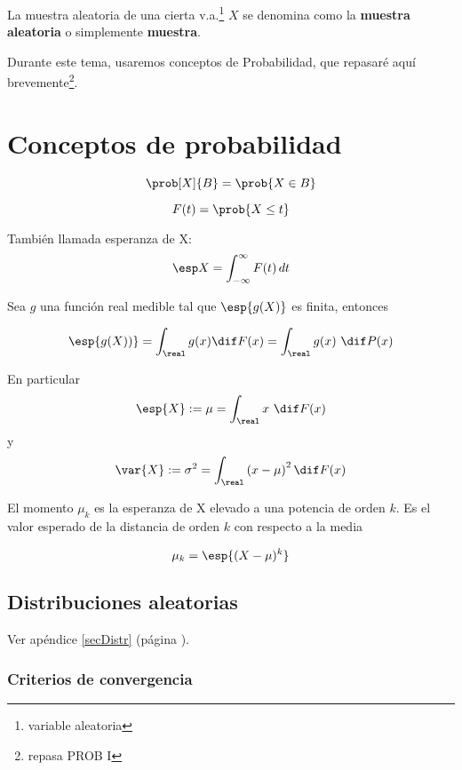 \documentclass{apuntes}
\begin{document}
La muestra aleatoria de una cierta v.a.\footnote{variable aleatoria} $X$ se denomina como la \textbf{muestra aleatoria} o simplemente \textbf{muestra}.

Durante este tema, usaremos conceptos de Probabilidad, que repasaré aquí brevemente\footnote{repasa PROB I}.

\section{Conceptos de probabilidad}

\begin{defn}
\[ \prob[X]{B} = \prob{X \in B} \]
\end{defn}

\begin{defn}
\[F(t) = \prob{X \leq t} \]
\end{defn}

\begin{defn}  También llamada esperanza de X:
\[ \esp X  = \int_{-\infty}^\infty F(t)\,dt \]
\end{defn}

\newpage
\begin{theorem} Sea $g$ una función real medible tal que $\esp{g(X)}$ es finita, entonces

\[ \esp{g(X))} = \int_\real g(x) \dif F(x) = \int_\real g(x) \dif P(x) \]

\noindent En particular \[ \esp{X} := \mu =\int_\real x \dif F(x)  \]
y \[ \var{X} := \sigma^2 = \int_\real \left(x - \mu\right)^2 \dif F(x) \]
\end{theorem}

\begin{defn}[Momento] El momento $\mu_k$ es la esperanza de X elevado a una potencia de orden $k$. Es el valor esperado de la distancia de orden $k$ con respecto a la media

\[ \mu_k = \esp{(X-\mu)^k} \]
\end{defn}

\subsection{Distribuciones aleatorias}

Ver apéndice \ref{secDistr} (página \pageref{secDistr}).

\subsubsection{Criterios de convergencia}
\end{document}
